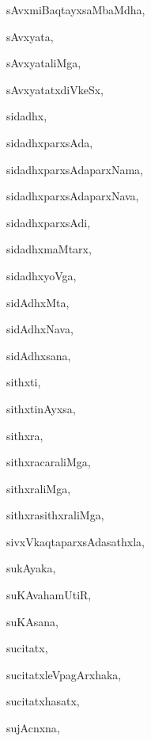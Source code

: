 \begin{multicols}{3}
{\noindent
{sAvxmiBaqtayxsaMbaMdha}, \pageref{sAvxmiBaqtayxsaMbaMdha}

\noindent
{sAvxyata}, \pageref{sAvxyata}

\noindent
{sAvxyataliMga}, \pageref{sAvxyataliMga}

\noindent
{sAvxyatatxdiVkeSx}, \pageref{sAvxyatatxdiVkeSx}

\noindent
{sidadhx}, \pageref{sidadhx}

\noindent
{sidadhxparxsAda}, \pageref{sidadhxparxsAda}

\noindent
{sidadhxparxsAdaparxNama}, \pageref{sidadhxparxsAdaparxNama}

\noindent
{sidadhxparxsAdaparxNava}, \pageref{sidadhxparxsAdaparxNava}

\noindent
{sidadhxparxsAdi}, \pageref{sidadhxparxsAdi}

\noindent
{sidadhxmaMtarx}, \pageref{sidadhxmaMtarx}

\noindent
{sidadhxyoVga}, \pageref{sidadhxyoVga}

\noindent
{sidAdhxMta}, \pageref{sidAdhxMta}

\noindent
{sidAdhxNava}, \pageref{sidAdhxNava}

\noindent
{sidAdhxsana}, \pageref{sidAdhxsana}

\noindent
{sithxti}, \pageref{sithxti}

\noindent
{sithxtinAyxsa}, \pageref{sithxtinAyxsa}

\noindent
{sithxra}, \pageref{sithxra}

\noindent
{sithxracaraliMga}, \pageref{sithxracaraliMga}

\noindent
{sithxraliMga}, \pageref{sithxraliMga}

\noindent
{sithxrasithxraliMga}, \pageref{sithxrasithxraliMga}

\noindent
{sivxVkaqtaparxsAdasathxla}, \pageref{sivxVkaqtaparxsAdasathxla}

\noindent
{sukAyaka}, \pageref{sukAyaka}

\noindent
{suKAvahamUtiR}, \pageref{suKAvahamUtiR}

\noindent
{suKAsana}, \pageref{suKAsana}

\noindent
{sucitatx}, \pageref{sucitatx}

\noindent
{sucitatxleVpagArxhaka}, \pageref{sucitatxleVpagArxhaka}

\noindent
{sucitatxhasatx}, \pageref{sucitatxhasatx}

\noindent
{sujAcnxna}, \pageref{sujAcnxna}

}
\end{multicols}
